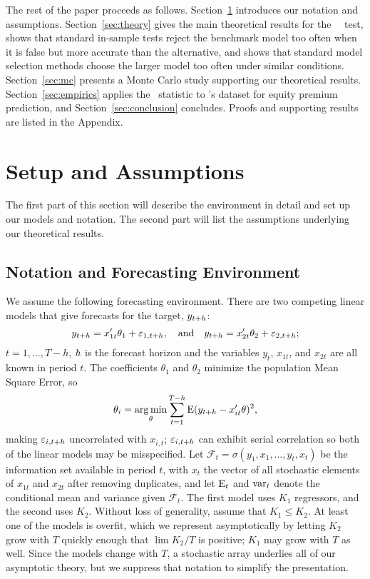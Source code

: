\documentclass[11pt]{article}
\newcommand{\e}{\varepsilon}
\newcommand{\citepos}[1]{\citeauthor{#1}'s \citeyearpar{#1}}
\begin{document}
The rest of the paper proceeds as follows.
Section~\ref{sec:assumptions} introduces our notation and assumptions.
Section~\ref{sec:theory} gives the main theoretical results for the
\dmw\ \oos\ test, shows that standard in-sample tests reject the
benchmark model too often when it is false but more accurate than the
alternative, and shows that standard model selection methods choose the
larger model too often under similar conditions. Section~\ref{sec:mc}
presents a Monte Carlo study supporting our theoretical results.
Section~\ref{sec:empirics} applies the \oos\ statistic to
\citepos{GoW:08} dataset for equity premium prediction, and
Section~\ref{sec:conclusion} concludes.  Proofs and supporting results
are listed in the Appendix.

\section{Setup and Assumptions}\label{sec:assumptions}
The first part of this section will describe the environment in detail
and set up our models and notation. The second part will list the
assumptions underlying our theoretical results.

\subsection{Notation and Forecasting Environment}
We assume the following forecasting environment. There are two
competing linear models that give forecasts for the target,
$y_{t+h}$:
\begin{equation}
y_{t+\h} = x_{1t}'\theta_1 + \e_{1,t+h}, \quad\text{and}\quad
y_{t+\h} = x_{2t}'\theta_2 + \e_{2,t+h};
\end{equation}
$t = 1,\dots,T-h$, $h$ is the forecast horizon and the
variables $y_t$, $x_{1t}$, and $x_{2t}$ are all known in period $t$.
The coefficients $\theta_1$ and $\theta_2$ minimize the population
Mean Square Error, so
\begin{equation}
  \theta_i = \operatorname*{arg\,min}_\theta \sum_{t=1}^{T-h} \operatorname{E} (y_{t+h} - x_{it}'\theta)^2,
\end{equation}
making $\e_{i,t+\h}$ uncorrelated with $x_{i,t}$; $\e_{i,t+\h}$ can exhibit
serial correlation so both of the linear models may be misspecified.
Let $\mathcal{F}_t = \sigma(y_1, x_1, \dots, y_t, x_t)$ be the information
set available in period $t$,
with $x_t$ the vector of all stochastic elements of $x_{1t}$ and $x_{2t}$ after
removing duplicates, and let $\operatorname{E}_t$ and $\operatorname{var}_t$ denote the
conditional mean and variance given $\mathcal{F}_t$.  The first model
uses $K_1$ regressors, and the second uses $K_2$.  Without loss of
generality, assume that $K_1 \leq K_2$. At least one of the models is
overfit, which we represent asymptotically by letting $K_2$ grow with
$T$ quickly enough that $\lim K_2/T$ is positive; $K_1$ may grow with
$T$ as well. Since the models change with $T$, a
stochastic array underlies all of our asymptotic theory, but we
suppress that notation to simplify the presentation.
\end{document}
